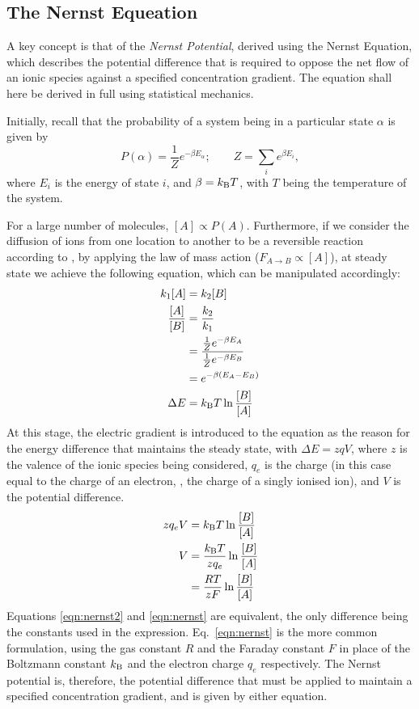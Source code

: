 \documentclass[../thesis-main.tex]{subfiles}
\begin{document}
 \subsection{The Nernst Equeation}
 \label{subsec:nernst}
 A key concept is that of the \emph{Nernst Potential}, derived using the Nernst Equation, which describes the potential difference that is required to oppose the net flow of an ionic species against a specified concentration gradient. The equation shall here be derived in full using statistical mechanics.
 
 Initially, recall that the probability of a system being in a particular state $\alpha$ is given by
 \begin{equation}
  P(\alpha) = \frac{1}{Z}e^{-\beta E_\alpha}; \qquad Z = \sum_i e^{\beta E_i},
 \end{equation}
 where $E_i$ is the energy of state $i$, and $\beta = k_\textnormal{B}T$, with $T$ being the temperature of the system.
 
 For a large number of molecules, $[A] \propto P(A)$. Furthermore, if we consider the diffusion of ions from one location to another to be a reversible reaction according to , by applying the law of mass action ($F_{A\rightarrow B} \propto [A]$), at steady state we achieve the following equation, which can be manipulated accordingly:
 \begin{align}
  k_1[A]		& = k_2[B] \\
  \frac{[A]}{[B]}	& = \frac{k_2}{k_1} \\
			& = \frac{\frac{1}{Z}e^{-\beta E_A}}{\frac{1}{Z}e^{-\beta E_B}} \\
			& = e^{-\beta(E_A-E_B)} \\
  \Delta E		& = k_\textnormal{B}T\ln\frac{[B]}{[A]}
 \end{align}
 At this stage, the electric gradient is introduced to the equation as the reason for the energy difference that maintains the steady state, with $\Delta E = zqV$, where $z$ is the valence of the ionic species being considered, $q_e$ is the charge (in this case equal to the charge of an electron, \idest, the charge of a singly ionised ion), and $V$ is the potential difference.
 \begin{align}
  zq_eV	& = k_\textnormal{B}T\ln\frac{[B]}{[A]} \\
  V	& = \frac{k_\textnormal{B}T}{zq_e}\ln\frac{[B]}{[A]} \\	\label{eqn:nernst2}
	& = \frac{RT}{zF}\ln\frac{[B]}{[A]} \\			\label{eqn:nernst}
 \end{align}
 Equations \ref{eqn:nernst2} and \ref{eqn:nernst} are equivalent, the only difference being the constants used in the expression. Eq.~\ref{eqn:nernst} is the more common formulation, using the gas constant $R$ and the Faraday constant $F$ in place of the Boltzmann constant $k_\textnormal{B}$ and the electron charge $q_e$ respectively. The Nernst potential is, therefore, the potential difference that must be applied to maintain a specified concentration gradient, and is given by either equation.
\end{document}
